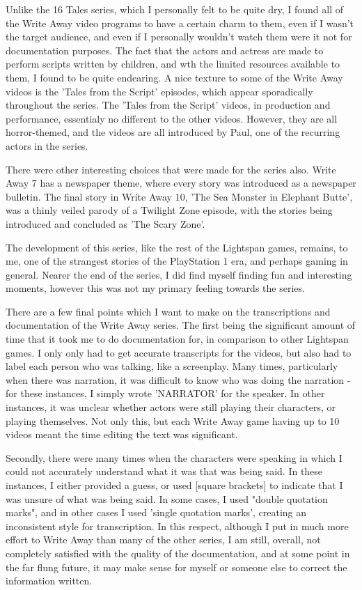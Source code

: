 Unlike the 16 Tales series, which I personally felt to be quite dry, I found all of the Write Away video programs to have a certain charm to them, even if I wasn't the target audience, and even if I personally wouldn't watch them were it not for documentation purposes.
The fact that the actors and actress are made to perform scripts written by children, and wth the limited resources available to them, I found to be quite endearing.
A nice texture to some of the Write Away videos is the 'Tales from the Script' episodes, which appear sporadically throughout the series.
The 'Tales from the Script' videos, in production and performance, essentialy no different to the other videos.
However, they are all horror-themed, and the videos are all introduced by Paul, one of the recurring actors in the series.

There were other interesting choices that were made for the series also.
Write Away 7 has a newspaper theme, where every story was introduced as a newspaper bulletin.
The final story in Write Away 10, 'The Sea Monster in Elephant Butte', was a thinly veiled parody of a Twilight Zone episode, with the stories being introduced and concluded as 'The Scary Zone'.

The development of this series, like the rest of the Lightspan games, remains, to me, one of the strangest stories of the PlayStation 1 era, and perhaps gaming in general.
Nearer the end of the series, I did find myself finding fun and interesting moments, however this was not my primary feeling towards the series.

There are a few final points which I want to make on the transcriptions and documentation of the Write Away series.
The first being the significant amount of time that it took me to do documentation for, in comparison to other Lightspan games.
I only only had to get accurate transcripts for the videos, but also had to label each person who was talking, like a screenplay.
Many times, particularly when there was narration, it was difficult to know who was doing the narration - for these instances, I simply wrote 'NARRATOR' for the speaker.
In other instances, it was unclear whether actors were still playing their characters, or playing themselves.
Not only this, but each Write Away game having up to 10 videos meant the time editing the text was significant.

Secondly, there were many times when the characters were speaking in which I could not accurately understand what it was that was being said.
In these instances, I either provided a guess, or used [square brackets] to indicate that I was unsure of what was being said.
In some cases, I used "double quotation marks", and in other cases I used 'single quotation marks', creating an inconsistent style for transcription.
In this respect, although I put in much more effort to Write Away than many of the other series, I am still, overall, not completely satisfied with the quality of the documentation, and at some point in the far flung future, it may make sense for myself or someone else to correct the information written.

